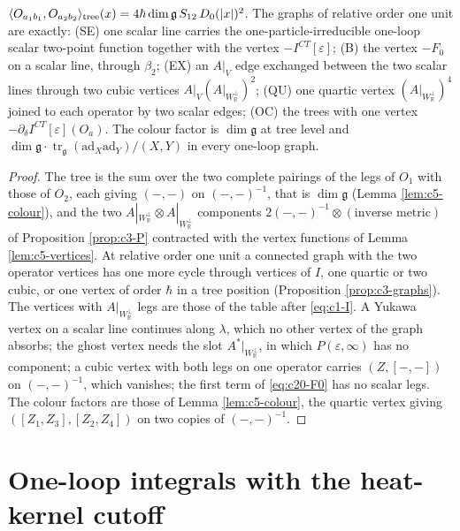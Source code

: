 \begin{lemma}
\label{lem:c20-census}
$\langle O_{a_1b_1},O_{a_2b_2}\rangle_{\rm tree}(x)=4\hbar\dim\mathfrak g\,S_{12}\,D_0(|x|)^2$. The graphs of relative order one unit are exactly: (SE) one scalar line carries the one-particle-irreducible one-loop scalar two-point function together with the vertex $-I^{CT}[\varepsilon]$; (B) the vertex $-F_0$ on a scalar line, through $\beta_2$; (EX) an $A|_V$ edge exchanged between the two scalar lines through two cubic vertices $A|_V(A|_{W_{\mathbb R}^\perp})^2$; (QU) one quartic vertex $(A|_{W_{\mathbb R}^\perp})^4$ joined to each operator by two scalar edges; (OC) the trees with one vertex $-\partial_\delta I^{CT}[\varepsilon](O_a)$. The colour factor is $\dim\mathfrak g$ at tree level and $\dim\mathfrak g\cdot\operatorname{tr}_{\mathfrak g}(\mathrm{ad}_X\mathrm{ad}_Y)/(X,Y)$ in every one-loop graph.
\end{lemma}

\begin{proof}
The tree is the sum over the two complete pairings of the legs of $O_1$ with those of $O_2$, each giving $(-,-)$ on $(-,-)^{-1}$, that is $\dim\mathfrak g$ (Lemma \ref{lem:c5-colour}), and the two $A|_{W_{\mathbb R}^\perp}\otimes A|_{W_{\mathbb R}^\perp}$ components $2(-,-)^{-1}\otimes(\text{inverse metric})$ of Proposition \ref{prop:c3-P} contracted with the vertex functions of Lemma \ref{lem:c5-vertices}. At relative order one unit a connected graph with the two operator vertices has one more cycle through vertices of $I$, one quartic or two cubic, or one vertex of order $\hbar$ in a tree position (Proposition \ref{prop:c3-graphs}). The vertices with $A|_{W_{\mathbb R}^\perp}$ legs are those of the table after \eqref{eq:c1-I}. A Yukawa vertex on a scalar line continues along $\lambda$, which no other vertex of the graph absorbs; the ghost vertex needs the slot $A^*|_{W_{\mathbb R}^\perp}$, in which $P(\varepsilon,\infty)$ has no component; a cubic vertex with both legs on one operator carries $(Z,[-,-])$ on $(-,-)^{-1}$, which vanishes; the first term of \eqref{eq:c20-F0} has no scalar legs. The colour factors are those of Lemma \ref{lem:c5-colour}, the quartic vertex giving $([Z_1,Z_3],[Z_2,Z_4])$ on two copies of $(-,-)^{-1}$.
\end{proof}

\section{One-loop integrals with the heat-kernel cutoff}

